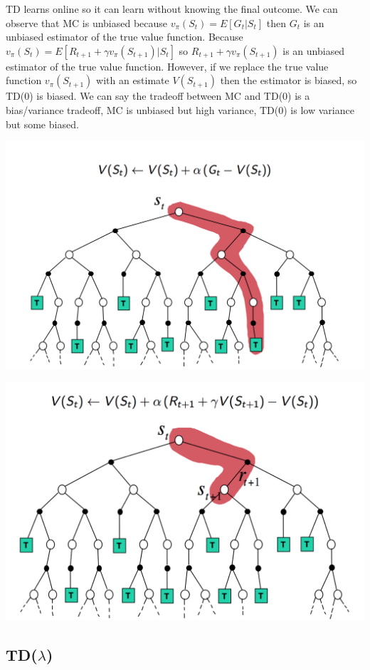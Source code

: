 \documentclass[graybox]{svmult}
\begin{document}
TD learns online so it can learn without knowing the final outcome. We can observe that MC is unbiased because $v_{\pi}(S_t) = E[G_t | S_t]$ then $G_t$ is an unbiased estimator of the true value function. Because $v_{\pi}(S_t) = E[R_{t+1} + \gamma v_{\pi}(S_{t+1})| S_t]$ so $R_{t+1} + \gamma v_{\pi}(S_{t+1})$ is an unbiased estimator of the true value function. However, if we replace the true value function $v_{\pi}(S_{t+1})$ with an estimate $V(S_{t+1})$ then the estimator is biased, so TD(0) is biased. We can say the tradeoff between MC and TD(0) is a bias/variance tradeoff, MC is unbiased but high variance, TD(0) is low variance but some biased.


\includegraphics[width=\textwidth]{mc.png}

\includegraphics[width=\textwidth]{td.png}

\subsection{TD($\lambda$)}
\end{document}
